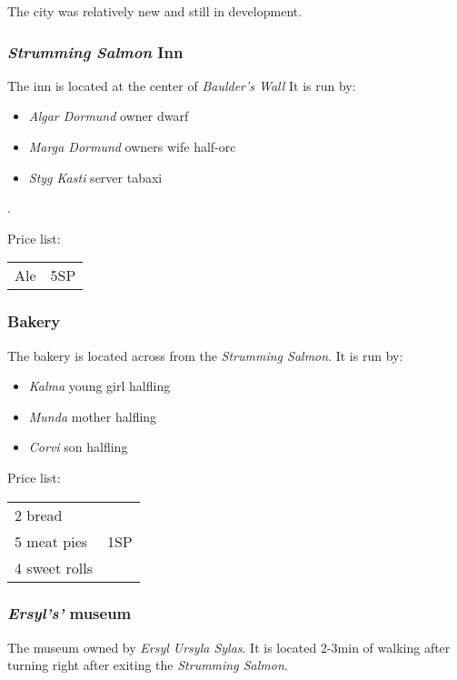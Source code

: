 \documentclass{article}
\begin{document}
\begin{multicols}{2}
    The city was relatively new and still in development.

    \subsubsection{ \textit{Strumming Salmon} Inn}

    The inn is located at the center of \textit{Baulder's Wall} It is run by:

    \begin{itemize}
        \item \textit{Algar Dormund} owner dwarf
        \item \textit{Marga Dormund} owners wife half-orc
        \item \textit{Styg Kasti} server tabaxi
    \end{itemize}.

    Price list:

    \begin{tabular}{l r}
        Ale & 5SP
    \end{tabular}

    \subsubsection{Bakery}

    The bakery is located across from the \textit{Strumming Salmon}. It is run by:

    \begin{itemize}
        \item \textit{Kalma} young girl halfling
        \item \textit{Munda} mother halfling
        \item \textit{Corvi} son halfling
    \end{itemize}

    Price list:

    \begin{tabular}{l r}
        2 bread & \multirow{3}{1cm}{1SP} \\
        5 meat pies                      \\
        4 sweet rolls
    \end{tabular}

    \subsubsection{ \textit{Ersyl's'} museum}

    The museum owned by \textit{Ersyl Ursyla Sylas}. It is located 2-3min of walking after turning right after exiting the \textit{Strumming Salmon}.


\end{multicols}
\end{document}
